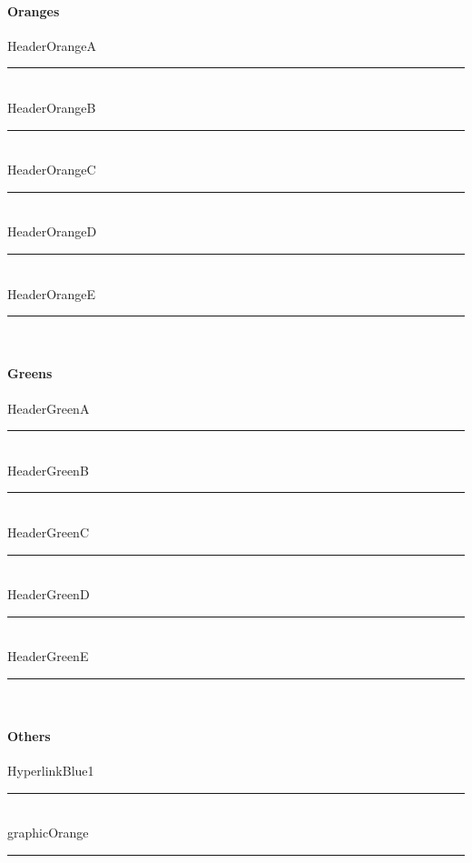 \paragraph[Oranges]{Oranges\texorpdfstring{\\}{}}
\textcolor{HeaderOrangeA}{HeaderOrangeA}
\noindent\textcolor{HeaderOrangeA}{\rule{.5\textwidth}{.5mm}}\\
\textcolor{HeaderOrangeB}{HeaderOrangeB}
\noindent\textcolor{HeaderOrangeB}{\rule{.5\textwidth}{.5mm}}\\
\textcolor{HeaderOrangeC}{HeaderOrangeC}
\noindent\textcolor{HeaderOrangeC}{\rule{.5\textwidth}{.5mm}}\\
\textcolor{HeaderOrangeD}{HeaderOrangeD}
\noindent\textcolor{HeaderOrangeD}{\rule{.5\textwidth}{.5mm}}\\
\textcolor{HeaderOrangeE}{HeaderOrangeE}
\noindent\textcolor{HeaderOrangeE}{\rule{.5\textwidth}{.5mm}}\\
\paragraph[Geens]{Greens\texorpdfstring{\\}{}}
\textcolor{HeaderGreenA}{HeaderGreenA}
\noindent\textcolor{HeaderGreenA}{\rule{.5\textwidth}{.5mm}}\\
\textcolor{HeaderGreenB}{HeaderGreenB}
\noindent\textcolor{HeaderGreenB}{\rule{.5\textwidth}{.5mm}}\\
\textcolor{HeaderGreenC}{HeaderGreenC}
\noindent\textcolor{HeaderGreenC}{\rule{.5\textwidth}{.5mm}}\\
\textcolor{HeaderGreenD}{HeaderGreenD}
\noindent\textcolor{HeaderGreenD}{\rule{.5\textwidth}{.5mm}}\\
\textcolor{HeaderGreenE}{HeaderGreenE}
\noindent\textcolor{HeaderGreenE}{\rule{.5\textwidth}{.5mm}}\\
\paragraph[Others]{Others\texorpdfstring{\\}{}}
\textcolor{HyperlinkBlue1}{HyperlinkBlue1}
\noindent\textcolor{HyperlinkBlue1}{\rule{.5\textwidth}{.5mm}}\\
\textcolor{graphicOrange}{graphicOrange}
\noindent\textcolor{graphicOrange}{\rule{.5\textwidth}{.5mm}}\\
\clearpage
